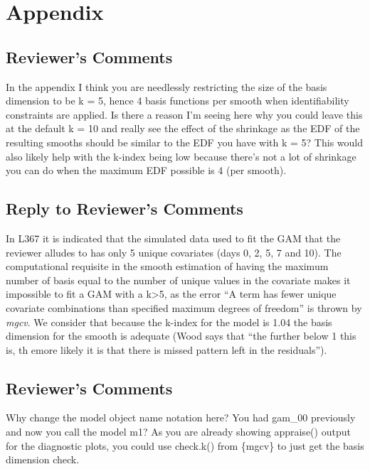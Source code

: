 \documentclass[
]{article}
\begin{document}
\hypertarget{appendix}{%
\section{Appendix}\label{appendix}}

\hypertarget{reviewers-comments-8}{%
\subsection{Reviewer's Comments}\label{reviewers-comments-8}}

In the appendix I think you are needlessly restricting the size of the basis dimension to be k = 5, hence 4 basis functions per smooth when identifiability constraints are applied. Is there a reason I'm seeing here why you could leave this at the default k = 10 and really see the effect of the shrinkage as the EDF of the resulting smooths should be similar to the EDF you have with k = 5? This would also likely help with the k-index being low because there's not a lot of shrinkage you can do when the maximum EDF possible is 4 (per smooth).

\hypertarget{section-8}{%
\subsection{\texorpdfstring{\textcolor{reviewersblue} {Reply to Reviewer's Comments}}{}}\label{section-8}}

In L367 it is indicated that the simulated data used to fit the GAM that the reviewer alludes to has only 5 unique covariates (days 0, 2, 5, 7 and 10). The computational requisite in the smooth estimation of having the maximum number of basis equal to the number of unique values in the covariate makes it impossible to fit a GAM with a k\textgreater5, as the error ``A term has fewer unique covariate combinations than specified maximum degrees of freedom'' is thrown by \emph{mgcv}. We consider that because the k-index for the model is 1.04 the basis dimension for the smooth is adequate (Wood says that ``the further below 1 this is, th emore likely it is that there is missed pattern left in the residuals'').

\hypertarget{reviewers-comments-9}{%
\subsection{Reviewer's Comments}\label{reviewers-comments-9}}

Why change the model object name notation here? You had gam\_00 previously and now you call the model m1? As you are already showing appraise() output for the diagnostic plots, you could use check.k() from \{mgcv\} to just get the basis dimension check.
\end{document}
